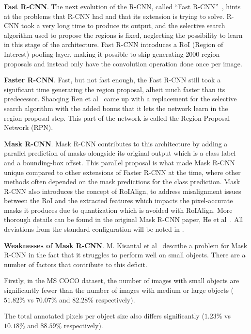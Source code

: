 \documentclass[oneside, english, bibtex]{kththesis}
\begin{document}
\textbf{Fast R-CNN}. The next evolution of the R-CNN, called “Fast R-CNN”~\cite{Girshick_2015_ICCV}, hints at the problems that R-CNN had and that its extension is trying to solve. R-CNN took a very long time to produce its output, and the selective search algorithm used to propose the regions is fixed, neglecting the possibility to learn in this stage of the architecture. Fast R-CNN introduces a RoI (Region of Interest) pooling layer, making it possible to skip generating 2000 region proposals and instead only have the convolution operation done once per image.

\textbf{Faster R-CNN}. Fast, but not fast enough, the Fast R-CNN still took a significant time generating the region proposal, albeit much faster than its predecessor. Shaoqing Ren et al~\cite{7485869} came up with a replacement for the selective search algorithm with the added bonus that it lets the network learn in the region proposal step. This part of the network is called the Region Proposal Network (RPN).

\textbf{Mask R-CNN}. Mask R-CNN contributes to this architecture by adding a parallel prediction of masks alongside its original output which is a class label and a bounding-box offset. This parallel proposal is what made Mask R-CNN unique compared to other extensions of Faster R-CNN at the time, where other methods often depended on the mask predictions for the class prediction. Mask R-CNN also introduces the concept of RoIAlign, to address misalignment issues between the RoI and the extracted features which impacts the pixel-accurate masks it produces due to quantization which is avoided with RoIAlign. More thorough details can be found in the original Mask R-CNN paper, He et al~\cite{DBLP:journals/corr/HeGDG17}. All deviations from the standard configuration will be noted in .

\textbf{Weaknesses of Mask R-CNN}.
M. Kisantal et al~\cite{DBLP:journals/corr/abs-1902-07296} describe a problem for Mask R-CNN in the fact that it struggles to perform well on small objects.
There are a number of factors that contribute to this deficit.

Firstly, in the MS COCO dataset, the number of images with small objects are significantly fewer than the number of images with medium or large objects ($51.82\%$ vs $70.07\%$ and $82.28\%$ respectively).

The total annotated pixels per object size also differs significantly ($1.23\%$ vs $10.18\%$ and $88.59\%$ respectively).
\end{document}
